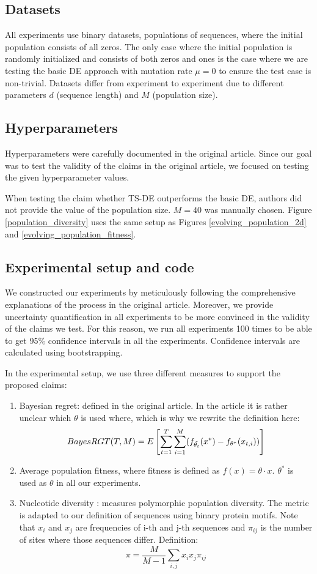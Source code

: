 \subsection{Datasets}
All experiments use binary datasets, populations of sequences, where the initial population consists of all zeros. The only case where the initial population is randomly initialized and consists of both zeros and ones is the case where we are testing the basic DE approach with mutation rate $\mu=0$ to ensure the test case is non-trivial. Datasets differ from experiment to experiment due to different parameters $d$ (sequence length) and $M$ (population size).

\subsection{Hyperparameters}
Hyperparameters were carefully documented in the original article. Since our goal was to test the validity of the claims in the original article, we focused on testing the given hyperparameter values.

When testing the claim whether TS-DE outperforms the basic DE, authors did not provide the value of the population size. $M=40$ was manually chosen. Figure \ref{population_diversity} uses the same setup as Figures \ref{evolving_population_2d} and \ref{evolving_population_fitness}.

\subsection{Experimental setup and code}
We constructed our experiments by meticulously following the comprehensive explanations of the process in the original article. Moreover, we provide uncertainty quantification in all experiments to be more convinced in the validity of the claims we test. For this reason, we run all experiments 100 times to be able to get 95\% confidence intervals in all the experiments. Confidence intervals are calculated using bootstrapping.

In the experimental setup, we use three different measures to support the proposed claims:
\begin{enumerate}
    \item Bayesian regret: defined in the original article. In the article it is rather unclear which $\theta$ is used where, which is why we rewrite the definition here: 
    \[BayesRGT(T, M) = E \left[\sum_{t=1}^{T}\sum_{i=1}^{M} (f_{\Tilde{\theta_{t}}}(x^*) - f_{\theta^*}(x_{t,i}))\right]\]
    \item Average population fitness, where fitness is defined as $f(x) = \theta \cdot x$. $\theta^*$ is used as $\theta$ in all our experiments.
    \item Nucleotide diversity \cite{nucleotide-diversity}: measures polymorphic population diversity. The metric is adapted to our definition of sequences using binary protein motifs. Note that $x_i$ and $x_j$ are frequencies of i-th and j-th sequences and $\pi_{ij}$ is the number of sites where those sequences differ. Definition:
    \[\pi = \frac{M}{M - 1} \sum_{i,j} x_i x_j \pi_{ij}\]
\end{enumerate}

